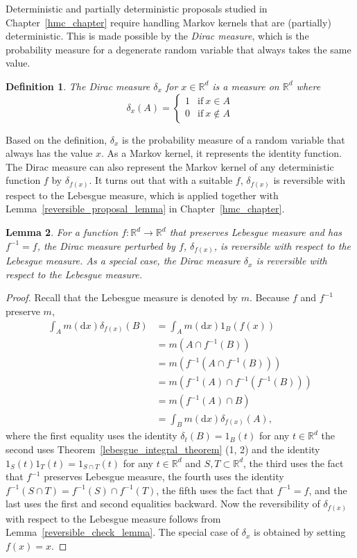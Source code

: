 \documentclass[english,twoside,openright]{HYgraduMLDS}
\newtheorem{lemma}{Lemma}[chapter]
\newtheorem{definition}[lemma]{Definition}
\newcommand{\R}{\mathbb{R}}
\newcommand{\dx}{\mathrm{d}}
\begin{document}
Deterministic and partially deterministic proposals studied in
Chapter~\ref{hmc_chapter} require handling Markov kernels that are (partially)
deterministic. This is made possible by the \emph{Dirac measure}, which is
the probability measure for a degenerate random variable that always takes
the same value.
\begin{definition}
	The Dirac measure \(\delta_{x}\) for \(x\in \R^{d}\) is a measure on \(\R^{d}\)
  where
  \[
    \delta_{x}(A) = \begin{cases}
      1 & \mathrm{if}\  x\in A\\
      0 & \mathrm{if}\  x\notin A
    \end{cases}
  \]
\end{definition}
Based on the definition, \(\delta_{x}\) is the probability measure of a random
variable that always has the value \(x\). As a Markov kernel, it represents
the identity function. The Dirac measure can also represent the Markov kernel
of any deterministic function \(f\) by \(\delta_{f(x)}\). It turns out that
with a suitable \(f\), \(\delta_{f(x)}\) is reversible with respect to the
Lebesgue measure, which is applied together with
Lemma~\ref{reversible_proposal_lemma} in Chapter~\ref{hmc_chapter}.

\begin{lemma}\label{dirac_measure_reversible_lemma}
  For a function \(f\colon \R^{d}\to \R^{d}\) that preserves Lebesgue measure and has
  \(f^{-1} = f\),
	the Dirac measure perturbed by \(f\), \(\delta_{f(x)}\), is reversible
  with respect to the Lebesgue measure. As a special case,
  the Dirac measure \(\delta_{x}\) is reversible with respect to the
  Lebesgue measure.
\end{lemma}
\begin{proof}
  Recall that the Lebesgue measure is denoted by \(m\). Because \(f\) and
  \(f^{-1}\) preserve \(m\),
	\begin{align*}
    \int_{A}m(\dx x)\delta_{f(x)}(B)
    &= \int_{A}m(\dx x)1_{B}(f(x))
    \\&= m(A\cap f^{-1}(B))
    \\&= m(f^{-1}(A\cap f^{-1}(B)))
    \\&= m(f^{-1}(A)\cap f^{-1}(f^{-1}(B)))
    \\&= m(f^{-1}(A)\cap B)
    \\&= \int_{B}m(\dx x)\delta_{f(x)}(A),
  \end{align*}
  where the first equality uses the identity \(\delta_{t}(B) = 1_{B}(t)\)
  for any \(t\in \R^{d}\) the second uses
  Theorem~\ref{lebesgue_integral_theorem} (1, 2) and the identity
  \(1_{S}(t)1_{T}(t) = 1_{S\cap T}(t)\) for any \(t\in \R^{d}\) and
  \(S, T\subset \R^{d}\),
  the third uses the fact that \(f^{-1}\) preserves Lebesgue measure,
  the fourth uses the identity \(f^{-1}(S\cap T) = f^{-1}(S)\cap f^{-1}(T)\),
  the fifth uses the fact that \(f^{-1} = f\), and the last uses
  the first and second equalities backward.
  Now the reversibility of \(\delta_{f(x)}\) with respect to the Lebesgue measure
  follows from Lemma~\ref{reversible_check_lemma}.
  The special case of \(\delta_{x}\) is obtained by setting \(f(x) = x\).
\end{proof}
\end{document}
